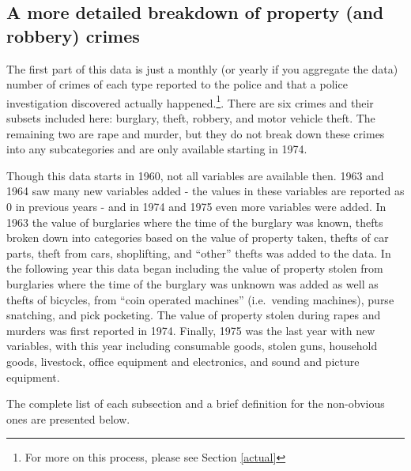 \documentclass[
]{krantz}
\begin{document}
\subsection{A more detailed breakdown of property (and
robbery) crimes}\label{propertycount}

The first part of this data is just a monthly (or yearly if
you aggregate the data) number of crimes of each type
reported to the police and that a police investigation
discovered actually happened.\footnote{For more on this
  process, please see Section \ref{actual}}. There are six
crimes and their subsets included here: burglary, theft,
robbery, and motor vehicle theft. The remaining two are rape
and murder, but they do not break down these crimes into any
subcategories and are only available starting in 1974.

Though this data starts in 1960, not all variables are
available then. 1963 and 1964 saw many new variables added -
the values in these variables are reported as 0 in previous
years - and in 1974 and 1975 even more variables were added.
In 1963 the value of burglaries where the time of the
burglary was known, thefts broken down into categories based
on the value of property taken, thefts of car parts, theft
from cars, shoplifting, and ``other'' thefts was added to
the data. In the following year this data began including
the value of property stolen from burglaries where the time
of the burglary was unknown was added as well as thefts of
bicycles, from ``coin operated machines'' (i.e.~vending
machines), purse snatching, and pick pocketing. The value of
property stolen during rapes and murders was first reported
in 1974. Finally, 1975 was the last year with new variables,
with this year including consumable goods, stolen guns,
household goods, livestock, office equipment and
electronics, and sound and picture equipment.

The complete list of each subsection and a brief definition
for the non-obvious ones are presented below.
\end{document}
